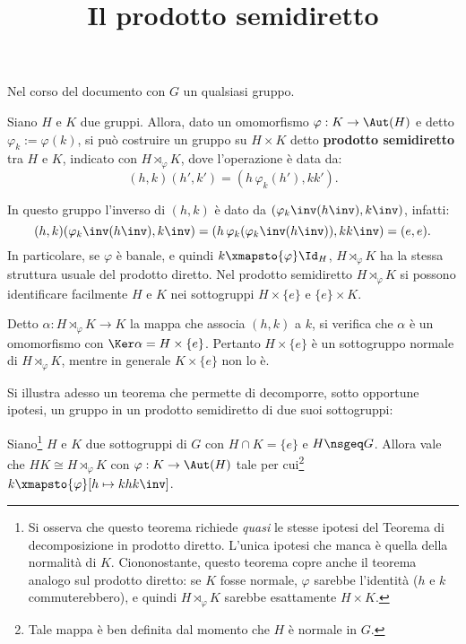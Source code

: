 \documentclass[12pt]{scrartcl}
\begin{document}
	\title{Il prodotto semidiretto}
	\maketitle
	
	\begin{note}
		Nel corso del documento con $G$ un qualsiasi gruppo.
	\end{note}

	Siano $H$ e $K$ due gruppi. Allora, dato un omomorfismo $\varphi : K \to \Aut(H)$ e
	detto $\varphi_k := \varphi(k)$,
	si può costruire un gruppo su $H \times K$ detto \textbf{prodotto semidiretto} tra $H$ e $K$,
	indicato con $H \rtimes_\varphi K$, dove l'operazione è data da:
	\[ (h,k)(h',k') = (h \, \varphi_k(h'), k k'). \]
	
	In questo gruppo l'inverso di $(h, k)$ è dato da $(\varphi_k\inv(h\inv), k\inv)$,
	infatti:
	\[ (h, k) (\varphi_k\inv(h\inv), k\inv) = (h \, \varphi_k(\varphi_k\inv(h\inv)), kk\inv) = (e, e). \]
	In particolare, se $\varphi$ è banale, e quindi $k \xmapsto{\varphi} \Id_H$,
	$H \rtimes_\varphi K$ ha la stessa struttura usuale del prodotto diretto. Nel
	prodotto semidiretto $H \rtimes_\varphi K$ si possono identificare facilmente
	$H$ e $K$ nei sottogruppi $H \times \{e\}$ e $\{e\} \times K$. \medskip
	
	
	Detto $\alpha: H \rtimes_\varphi K \to K$ la mappa che associa $(h, k)$ a
	$k$, si verifica che $\alpha$ è un omomorfismo con $\Ker \alpha = H \times \{e\}$.
	Pertanto $H \times \{e\}$ è un sottogruppo normale di $H \rtimes_\varphi K$,
	mentre in generale $K \times \{e\}$ non lo è. \medskip
	
	
	Si illustra adesso un teorema che permette di decomporre, sotto opportune ipotesi,
	un gruppo in un prodotto semidiretto di due suoi sottogruppi:
	
	\begin{theorem}
		Siano\footnote{
			Si osserva che questo teorema richiede \textit{quasi} le stesse ipotesi
			del Teorema di decomposizione in prodotto diretto. L'unica ipotesi che
			manca è quella della normalità di $K$. Ciononostante, questo teorema
			copre anche il teorema analogo sul prodotto diretto: se $K$ fosse normale,
			$\varphi$ sarebbe l'identità ($h$ e $k$ commuterebbero), e quindi
			$H \rtimes_\varphi K$ sarebbe esattamente $H \times K$.
		} $H$ e $K$ due sottogruppi di $G$ con $H \cap K = \{e\}$ e
		$H \nsgeq G$. Allora vale che $HK \cong H \rtimes_\varphi K$ con
		$\varphi : K \to \Aut(H)$ tale per cui\footnote{
			Tale mappa è ben definita dal momento che $H$ è normale in $G$.
		} $k \xmapsto{\varphi} [h \mapsto k h k\inv]$.
	\end{theorem}
	
\end{document}
